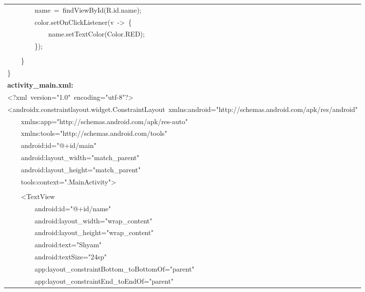 \documentclass[a4paper,12pt]{article}
\begin{document}
\begin{longtable}{|p{}|}
{\ttfamily\small \ \ \ \ \ \ \ \ name\ =\ findViewById(R.id.name);} \\
{\ttfamily\small \ \ \ \ \ \ \ \ color.setOnClickListener(v\ -\textgreater{}\ \{} \\
{\ttfamily\small \ \ \ \ \ \ \ \ \ \ \ \ name.setTextColor(Color.RED);} \\
{\ttfamily\small \ \ \ \ \ \ \ \ \});} \\
\strut \\
{\ttfamily\small \ \ \ \ \}} \\
{\ttfamily\small \}} \\
\hline
\rule{0pt}{13pt}\textbf{activity\_main.xml:} \\
\hline
{\ttfamily\small \textless{}?xml\ version="1.0"\ encoding="utf-8"?\textgreater{}} \\
{\ttfamily\small \textless{}androidx.constraintlayout.widget.ConstraintLayout\ xmlns:android="http://schemas.android.com/apk/res/android"} \\
{\ttfamily\small \ \ \ \ xmlns:app="http://schemas.android.com/apk/res-auto"} \\
{\ttfamily\small \ \ \ \ xmlns:tools="http://schemas.android.com/tools"} \\
{\ttfamily\small \ \ \ \ android:id="@+id/main"} \\
{\ttfamily\small \ \ \ \ android:layout\_width="match\_parent"} \\
{\ttfamily\small \ \ \ \ android:layout\_height="match\_parent"} \\
{\ttfamily\small \ \ \ \ tools:context=".MainActivity"\textgreater{}} \\
\strut \\
{\ttfamily\small \ \ \ \ \textless{}TextView} \\
{\ttfamily\small \ \ \ \ \ \ \ \ android:id="@+id/name"} \\
{\ttfamily\small \ \ \ \ \ \ \ \ android:layout\_width="wrap\_content"} \\
{\ttfamily\small \ \ \ \ \ \ \ \ android:layout\_height="wrap\_content"} \\
{\ttfamily\small \ \ \ \ \ \ \ \ android:text="Shyam"} \\
{\ttfamily\small \ \ \ \ \ \ \ \ android:textSize="24sp"} \\
{\ttfamily\small \ \ \ \ \ \ \ \ app:layout\_constraintBottom\_toBottomOf="parent"} \\
{\ttfamily\small \ \ \ \ \ \ \ \ app:layout\_constraintEnd\_toEndOf="parent"} \\

\end{longtable}
\end{document}
